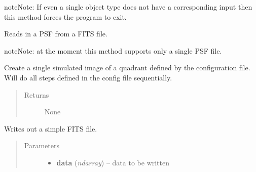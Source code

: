 \documentclass[a4paper,11pt,english]{sphinxmanual}
\begin{document}
\begin{fulllineitems}
\begin{fulllineitems}
\begin{notice}{note}{Note:}
If even a single object type does not have a corresponding input then this method
forces the program to exit.
\end{notice}

\end{fulllineitems}


\begin{fulllineitems}
\label{simulator:simulator.simulator.VISsimulator.readPSFs}
Reads in a PSF from a FITS file.

\begin{notice}{note}{Note:}
at the moment this method supports only a single PSF file.
\end{notice}

\end{fulllineitems}


\begin{fulllineitems}
\label{simulator:simulator.simulator.VISsimulator.simulate}
Create a single simulated image of a quadrant defined by the configuration file.
Will do all steps defined in the config file sequentially.
\begin{quote}\begin{description}
\item[{Returns}] \leavevmode
None

\end{description}\end{quote}

\end{fulllineitems}


\begin{fulllineitems}
\label{simulator:simulator.simulator.VISsimulator.writeFITSfile}
Writes out a simple FITS file.
\begin{quote}\begin{description}
\item[{Parameters}] \leavevmode\begin{itemize}
\item {} 
\textbf{data} (\emph{ndarray}) -- data to be written


\end{itemize}
\end{description}
\end{quote}
\end{fulllineitems}
\end{fulllineitems}
\end{document}

